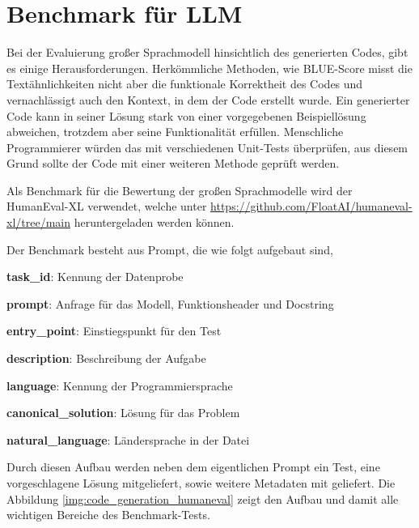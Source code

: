 

\section{Benchmark für LLM}
Bei der Evaluierung großer Sprachmodell hinsichtlich des generierten Codes, gibt es einige Herausforderungen. Herkömmliche Methoden, wie BLUE-Score misst die Textähnlichkeiten nicht aber die funktionale Korrektheit des Codes und vernachlässigt auch den Kontext, in dem der Code erstellt wurde. Ein generierter Code kann in seiner Lösung stark von einer vorgegebenen Beispiellösung abweichen, trotzdem aber seine Funktionalität erfüllen. Menschliche Programmierer würden das mit verschiedenen Unit-Tests überprüfen, aus diesem Grund sollte der Code mit einer weiteren Methode geprüft werden.\vspace{0.2cm}

Als Benchmark für die Bewertung der großen Sprachmodelle wird der HumanEval-XL verwendet, welche unter \href{https://github.com/FloatAI/humaneval-xl/tree/main}{https://github.com/FloatAI/humaneval-xl/tree/main} heruntergeladen werden können.\vspace{0.2cm}

Der Benchmark besteht aus Prompt, die wie folgt aufgebaut sind,

\begin{myitemize}
	\item \textbf{task\_id}: Kennung der Datenprobe
	\item \textbf{prompt}: Anfrage für das Modell, Funktionsheader und Docstring
	\item \textbf{entry\_point}: Einstiegspunkt für den Test
	\item \textbf{description}: Beschreibung der Aufgabe
	\item \textbf{language}: Kennung der Programmiersprache
	\item \textbf{canonical\_solution}: Lösung für das Problem
	\item \textbf{natural\_language}: Ländersprache in der Datei
\end{myitemize}

Durch diesen Aufbau werden neben dem eigentlichen Prompt ein Test, eine vorgeschlagene Lösung mitgeliefert, sowie weitere Metadaten mit geliefert. Die Abbildung \ref{img:code_generation_humaneval} zeigt den Aufbau und damit alle wichtigen Bereiche des Benchmark-Tests.

